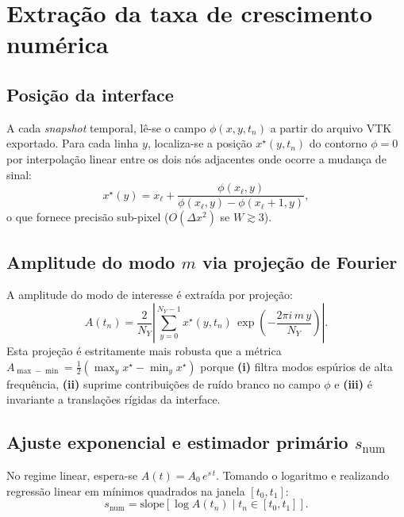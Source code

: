 \documentclass[11pt,a4paper]{article}
\begin{document}
\section{Extração da taxa de crescimento numérica}

\subsection{Posição da interface}

A cada \textit{snapshot} temporal, lê-se o campo $\phi(x,y,t_n)$ a partir
do arquivo VTK exportado. Para cada linha $y$, localiza-se a posição
$x^\star(y,t_n)$ do contorno $\phi=0$ por interpolação linear entre os
dois nós adjacentes onde ocorre a mudança de sinal:
\begin{equation}
    x^\star(y) = x_\ell + \frac{\phi(x_\ell, y)}{\phi(x_\ell,y) - \phi(x_\ell+1, y)},
\end{equation}
o que fornece precisão sub-pixel ($O(\Delta x^2)$ se $W \gtrsim 3$).

\subsection{Amplitude do modo $m$ via projeção de Fourier}

A amplitude do modo de interesse é extraída por projeção:
\begin{equation}
    A(t_n) = \frac{2}{N_Y}\left| \sum_{y=0}^{N_Y-1}
        x^\star(y, t_n)\,
        \exp\!\left( -\frac{2\pi i\,m\,y}{N_Y} \right) \right|.
    \label{eq:Amp}
\end{equation}
Esta projeção é estritamente mais robusta que a métrica
$A_{\max-\min} = \tfrac{1}{2}(\max_y x^\star - \min_y x^\star)$ porque
\textbf{(i)} filtra modos espúrios de alta frequência, \textbf{(ii)}
suprime contribuições de ruído branco no campo $\phi$ e \textbf{(iii)} é
invariante a translações rígidas da interface.

\subsection{Ajuste exponencial e estimador primário $s_{\mathrm{num}}$}

No regime linear, espera-se $A(t) = A_0\,e^{s\,t}$. Tomando o logaritmo e
realizando regressão linear em mínimos quadrados na janela
$[t_0, t_1]$:
\begin{equation}
    s_{\mathrm{num}} = \mathrm{slope}\!\left[ \log A(t_n) \;\big|\; t_n \in [t_0, t_1] \right].
    \label{eq:snum}
\end{equation}
\end{document}
